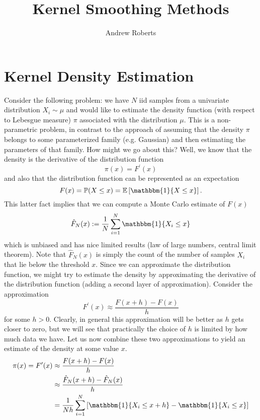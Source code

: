 \documentclass[12pt]{article}
\title{Kernel Smoothing Methods}
\author{Andrew Roberts}
\newcommand{\E}{\mathbb{E}}
\newcommand{\Prob}{\mathbb{P}}
\begin{document}
\maketitle
\tableofcontents
\newpage

\section{Kernel Density Estimation}
Consider the following problem: we have $N$ iid samples from a univariate distribution $X_i \sim \mu$ and would like to estimate the density function (with respect to Lebesgue measure) $\pi$ associated 
with the distribution $\mu$. This is a non-parametric problem, in contrast to the approach of assuming that the density $\pi$ belongs to some parameterized family (e.g. Gaussian) and then 
estimating the parameters of that family. How might we go about this? Well, we know that the density is the derivative of the distribution function
\[\pi(x) = F^\prime(x)\]
and also that the distribution function can be represented as an expectation 
\[F(x) = \Prob(X \leq x) = \E \left[\mathbbm{1}\{X \leq x\}\right].\]
This latter fact implies that we can compute a Monte Carlo estimate of $F(x)$
\[\hat{F}_N(x) := \frac{1}{N} \sum_{i = 1}^{N} \mathbbm{1}\{X_i \leq x\}\]
which is unbiased and has nice limited results (law of large numbers, central limit theorem). Note that $\hat{F}_N(x)$ is simply the count of the number of samples $X_i$ that lie below the threshold 
$x$. Since we can approximate the distribution function, we might try to estimate the density by approximating the derivative of the distribution function (adding a second layer of approximation). Consider the approximation 
\[F^\prime(x) \approx \frac{F(x + h) - F(x)}{h}\] 
for some $h > 0$. Clearly, in general this approximation will be better as $h$ gets closer to zero, but we will see that practically the choice of $h$ is limited by how much data we have. Let us now combine these two approximations 
to yield an estimate of the density at some value $x$.
\begin{align*}
\pi(x) = F^\prime(x) &\approx  \frac{F(x + h) - F(x)}{h} \\
			     &\approx \frac{\hat{F}_N(x + h) - \hat{F}_N(x)}{h} \\
			    &= \frac{1}{Nh} \sum_{i = 1}^{N} \left[\mathbbm{1}\{X_i \leq x + h\} - \mathbbm{1}\{X_i \leq x\} \right]
\end{align*}
\end{document}
